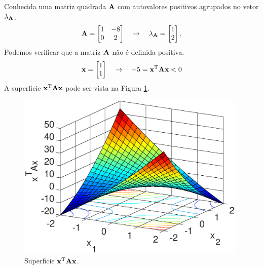 \noindent
\begin{minipage}{0.5\textwidth}
\begin{example}
\label{ex:positivematrix1}
Conhecida uma matriz quadrada $\MATRIX{A}$ com autovalores positivos agrupados no vetor $\VECTOR{\lambda}_{\MATRIX{A}}$, 
\begin{equation}
\MATRIX{A}=
\begin{bmatrix}
1 & -8\\
0 & 2
\end{bmatrix}
\quad \rightarrow \quad 
\VECTOR{\lambda}_{\MATRIX{A}}=
\begin{bmatrix}
1 \\
2
\end{bmatrix}.
\end{equation}
Podemos verificar que a matriz $\MATRIX{A}$ não é definida positiva.
\begin{equation}
\VECTOR{x}=
\begin{bmatrix}
1 \\
1
\end{bmatrix}
\quad \rightarrow \quad 
-5 = \VECTOR{x}^{\transpose}\MATRIX{A}\VECTOR{x}<0
\end{equation}
A superficie $\VECTOR{x}^{\transpose}\MATRIX{A}\VECTOR{x}$ 
pode ser vista na Figura \ref{fig:ex:positivematrix1}.
\end{example}
\end{minipage}
\begin{minipage}{0.5\textwidth}
     \begin{figure}[H]
         \centering
         \includegraphics[width=0.98\textwidth]{chapters/teoria-basica/mfiles/positive-matrix/surfcexAx.eps}
         \caption{Superficie $\VECTOR{x}^{\transpose}\MATRIX{A}\VECTOR{x}$. }
         \label{fig:ex:positivematrix1}
     \end{figure}
\end{minipage}
